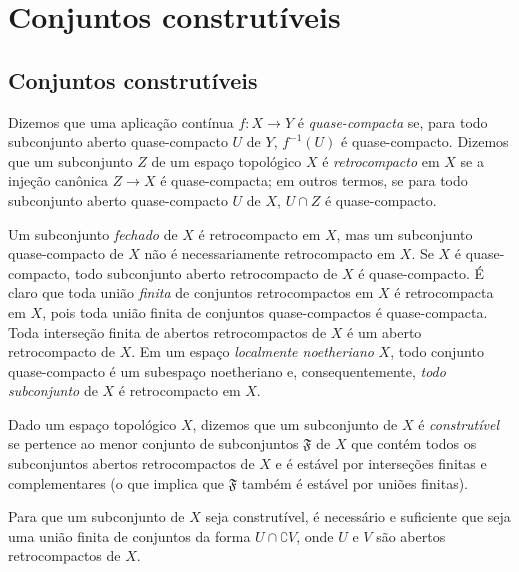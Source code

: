 \section{Conjuntos construtíveis}
\label{section:0.9}

\subsection{Conjuntos construtíveis}
\label{subsection:0.9.1}

\begin{definition}[9.1.1]
\label{0.9.1.1}
Dizemos que uma aplicação contínua $f:X\to Y$ é \emph{quase-compacta} se, para todo subconjunto aberto quase-compacto $U$ de $Y$, $f^{-1}(U)$ é quase-compacto.
Dizemos que um subconjunto $Z$ de um espaço topológico $X$ é \emph{retrocompacto} em $X$ se a injeção canônica $Z\to X$ é quase-compacta; em outros termos, se para todo subconjunto aberto quase-compacto $U$ de $X$, $U\cap Z$ é quase-compacto.
\end{definition}

Um subconjunto \emph{fechado} de $X$ é retrocompacto em $X$, mas um subconjunto quase-compacto de $X$ não é necessariamente retrocompacto em $X$.
Se $X$ é quase-compacto, todo subconjunto aberto retrocompacto de $X$ é quase-compacto.
É claro que toda união \emph{finita} de conjuntos retrocompactos em $X$ é retrocompacta em $X$, pois toda união finita de conjuntos quase-compactos é quase-compacta.
Toda interseção finita de abertos retrocompactos de $X$ é um aberto retrocompacto de $X$.
Em um espaço \emph{localmente noetheriano} $X$, todo conjunto quase-compacto é um subespaço noetheriano e, consequentemente, \emph{todo subconjunto} de $X$ é retrocompacto em $X$.

\begin{definition}[9.1.2]
\label{0.9.1.2}
Dado um espaço topológico $X$, dizemos que um subconjunto de $X$ é \emph{construtível} se pertence ao menor conjunto de subconjuntos $\mathfrak{F}$ de $X$ que contém todos os subconjuntos abertos retrocompactos de $X$ e é estável por interseções finitas e complementares (o que implica que $\mathfrak{F}$ também é estável por uniões finitas).
\end{definition}

\begin{proposition}[9.1.3]
\label{0.9.1.3}
Para que um subconjunto de $X$ seja construtível, é necessário e suficiente que seja uma união finita de conjuntos da forma $U\cap\complement{V}$, onde $U$ e $V$ são abertos retrocompactos de $X$.
\end{proposition}

